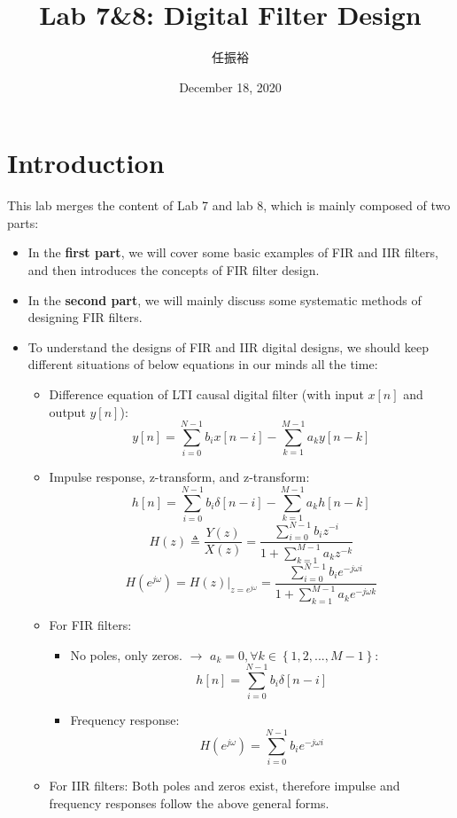 \documentclass[onecolumn,oneside]{SUSTechHomework}
\begin{document}
\title{Lab 7\&8: Digital Filter Design}
\author{任振裕}
\date{December 18, 2020}
\maketitle  
\tableofcontents
\section*{Introduction}
This lab merges the content of Lab 7 and lab 8, which is mainly composed of two parts:
\begin{itemize}
    \item In the \textbf{first part}, we will cover some basic examples of FIR and IIR filters, and then introduces the concepts
    of FIR filter design. 
    \item In the \textbf{second part}, we will mainly discuss some systematic methods of designing FIR filters.
	\item To understand the designs of FIR and IIR digital designs, we should keep different situations of below equations in our minds all 
	the time:
	\begin{info}
		\begin{itemize}
			\item Difference equation of LTI causal digital filter (with input $x[n]$ and output $y[n]$):
			$$
			y[n]=\sum_{i=0}^{N-1} b_{i} x[n-i]-\sum_{k=1}^{M-1} a_{k} y[n-k]
			$$
			\item Impulse response, z-transform, and z-transform:
			$$
			h[n]=\sum_{i=0}^{N-1} b_{i} \delta[n-i]-\sum_{k=1}^{M-1} a_{k} h[n-k]
			$$
			$$
			H(z) \triangleq \frac{Y(z)}{X(z)}=\frac{\sum_{i=0}^{N-1} b_{i} z^{-i}}{1+\sum_{k=1}^{M-1} a_{k} z^{-k}}
			$$
			$$
			H\left(e^{j \omega}\right)=\left.H(z)\right|_{z=e^{j\omega}}=\frac{\sum_{i=0}^{N-1} b_{i} e^{-j \omega i}}{1+\sum_{k=1}^{M-1} a_{k} e^{-j \omega k}}
			$$
		\end{itemize}
	\end{info}
	\begin{info}
		\begin{itemize}
			\item For FIR filters:
			\begin{itemize}
				\item No poles, only zeros. $\rightarrow$ $a_k=0,\forall k\in \left\{1,2,...,M-1\right\}$:
				$$
				h[n]=\sum_{i=0}^{N-1} b_{i} \delta[n-i]
				$$
				\item Frequency response:
				$$
				H\left(e^{j \omega}\right)=\sum_{i=0}^{N-1} b_{i} e^{-j \omega i}
				$$
			\end{itemize}
			\item For IIR filters: Both poles and zeros exist, therefore impulse and frequency responses follow the above general forms.
		\end{itemize}
	\end{info} 
\end{itemize}
\end{document}
